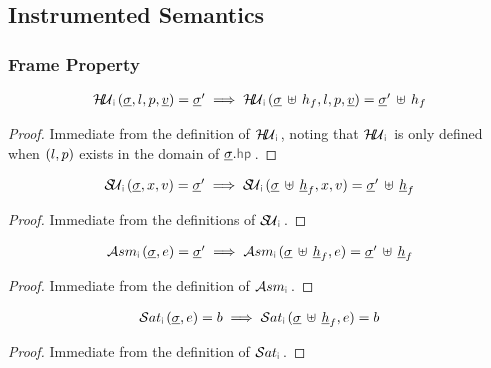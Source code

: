\subsection{Instrumented Semantics}

\subsubsection{Frame Property}

\begin{lemma}\label{lemma:frame:heap:update}
$$
\begin{array}{l}
\hpupdt{\instrumented}(\istate, \loc, p, \ival)  = \istate' \implies 
    \hpupdt{\instrumented}(\istate \dunion \heap_f, \loc, p, \ival) = \istate' \dunion \heap_f
\end{array}
$$
\end{lemma}
\begin{proof}
Immediate from the definition of $\hpupdt{\instrumented}$, 
noting that $\hpupdt{\instrumented}$ is only defined when $(l, p)$ exists in the 
domain of $\istate.\hpsel$. 
\end{proof}


\begin{lemma}\label{lemma:frame:store:update}
$$
\begin{array}{l}
 \stupdt{\instrumented}(\istate, \jvar, \val) = \istate'  \implies 
      \stupdt{\instrumented}(\istate \dunion \iheap_f, \jvar, \val) = \istate' \dunion \iheap_f
\end{array}
$$
\end{lemma}
\begin{proof}
Immediate from the definitions of $\stupdt{\instrumented}$.
\end{proof}


\begin{lemma}\label{lemma:frame:assume}
$$
\begin{array}{l}
\absassume{\instrumented}(\istate, \jsilexpr) =  \istate' 
    \implies \absassume{\instrumented}(\istate \dunion \iheap_f, \jsilexpr) =  \istate' \dunion \iheap_f
\end{array}
$$
\end{lemma}
\begin{proof}
Immediate from the definition of $\absassume{\instrumented}$.
\end{proof}

\begin{lemma}\label{lemma:frame:sat}
$$
\begin{array}{l}
      \abssat{\instrumented}(\istate, \jsilexpr) =  \jbool 
          \implies 
               \abssat{\instrumented}(\istate \dunion \iheap_f, \jsilexpr) =  \jbool 
\end{array}
$$
\end{lemma}
\begin{proof}
Immediate from the definition of $\abssat{\instrumented}$.
\end{proof}


